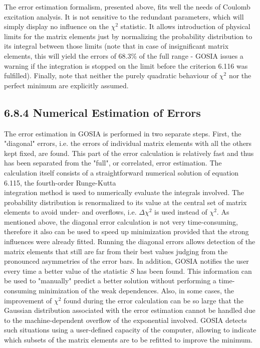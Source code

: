 \documentclass[10pt]{article}
\begin{document}
The error estimation formalism, presented above, fits well the needs of Coulomb excitation analysis. It is not sensitive to the redundant parameters, which will simply display no influence on the $\chi^{2}$ statistic. It allows introduction of physical limits for the matrix elements just by normalizing the probability distribution to its integral between those limits (note that in case of insignificant matrix elements, this will yield the errors of $68.3 \%$ of the full range - GOSIA issues a warning if the integration is stopped on the limit before the criterion 6.116 was fulfilled). Finally, note that neither the purely quadratic behaviour of $\chi^{2}$ nor the perfect minimum are explicitly assumed.

\subsection*{6.8.4 Numerical Estimation of Errors}
The error estimation in GOSIA is performed in two separate steps. First, the "diagonal" errors, i.e. the errors of individual matrix elements with all the others kept fixed, are found. This part of the error calculation is relatively fast and thus has been separated from the "full", or correlated, error estimation. The calculation itself consists of a straightforward numerical solution of equation 6.115, the fourth-order Runge-Kutta\\
integration method is used to numerically evaluate the integrals involved. The probability distribution is renormalized to its value at the central set of matrix elements to avoid under- and overflows, i.e. $\Delta \chi^{2}$ is used instead of $\chi^{2}$. As mentioned above, the diagonal error calculation is not very time-consuming, therefore it also can be used to speed up minimization provided that the strong influences were already fitted. Running the diagonal errors allows detection of the matrix elements that still are far from their best values judging from the pronounced asymmetries of the error bars. In addition, GOSIA notifies the user every time a better value of the statistic $S$ has been found. This information can be used to "manually" predict a better solution without performing a time-consuming minimization of the weak dependences. Also, in some cases, the improvement of $\chi^{2}$ found during the error calculation can be so large that the Gaussian distribution associated with the error estimation cannot be handled due to the machine-dependent overflow of the exponential involved. GOSIA detects such situations using a user-defined capacity of the computer, allowing to indicate which subsets of the matrix elements are to be refitted to improve the minimum.
\end{document}

